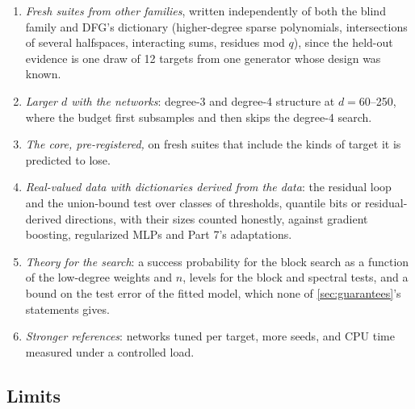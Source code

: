 \begin{enumerate}
\item \emph{Fresh suites from other families}, written independently of both the blind family and DFG's dictionary (higher-degree sparse polynomials, intersections of several halfspaces, interacting sums, residues mod $q$), since the held-out evidence is one draw of 12 targets from one generator whose design was known.
\item \emph{Larger $d$ with the networks}: degree-3 and degree-4 structure at $d=60$--250, where the budget first subsamples and then skips the degree-4 search.
\item \emph{The core, pre-registered,} on fresh suites that include the kinds of target it is predicted to lose.
\item \emph{Real-valued data with dictionaries derived from the data}: the residual loop and the union-bound test over classes of thresholds, quantile bits or residual-derived directions, with their sizes counted honestly, against gradient boosting, regularized MLPs and Part 7's adaptations.
\item \emph{Theory for the search}: a success probability for the block search as a function of the low-degree weights and $n$, levels for the block and spectral tests, and a bound on the test error of the fitted model, which none of \cref{sec:guarantees}'s statements gives.
\item \emph{Stronger references}: networks tuned per target, more seeds, and CPU time measured under a controlled load.
\end{enumerate}

\subsection{Limits}\label{sec:disc-limits}

